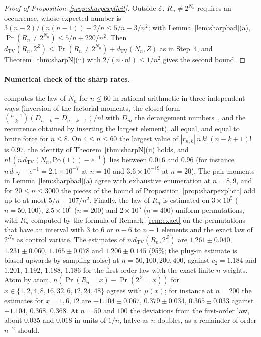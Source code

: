 \begin{proof}[Proof of Proposition~\ref{prop:sharpexplicit}]
Outside $\mathcal E$, $R_n\ne2^{N_n}$ requires an occurrence, whose expected number is $3(n-2)/(n(n-1))+2/n\le5/n-3/n^2$; with Lemma~\ref{lem:sharpbad}(a), $\Pr(R_n\ne2^{N_n})\le5/n+220/n^2$. Then $d_{\mathrm{TV}}(R_n,2^Z)\le\Pr(R_n\ne2^{N_n})+d_{\mathrm{TV}}(N_n,Z)$ as in Step~4, and Theorem~\ref{thm:sharpN}(ii) with $2/(n\cdot n!)\le1/n^2$ gives the second bound.
\end{proof}

\paragraph{Numerical check of the sharp rates.}
 computes the law of $N_n$ for $n\le60$ in rational arithmetic in three independent ways (inversion of the factorial moments, the closed form $\binom{n-1}{k}(D_{n-k}+D_{n-k-1})/n!$ with $D_m$ the derangement numbers~\citep{kaplansky1945}, and the recurrence obtained by inserting the largest element), all equal, and equal to brute force for $n\le8$. On $4\le n\le60$ the largest value of $|r_{n,k}|\,n\,k!\,(n-k+1)!$ is $0.97$, the identity of Theorem~\ref{thm:sharpN}(ii) holds, and $n!\,(n\,d_{\mathrm{TV}}(N_n,\mathrm{Po}(1))-e^{-1})$ lies between $0.016$ and $0.96$ (for instance $n\,d_{\mathrm{TV}}-e^{-1}=2.1\times10^{-7}$ at $n=10$ and $3.6\times10^{-19}$ at $n=20$). The pair moments in Lemma~\ref{lem:sharpbad}(a) agree with exhaustive enumeration at $n=8,9$, and for $20\le n\le3000$ the pieces of the bound of Proposition~\ref{prop:sharpexplicit} add up to at most $5/n+107/n^2$. Finally, the law of $R_n$ is estimated on $3\times10^5$ ($n=50,100$), $2.5\times10^5$ ($n=200$) and $2\times10^5$ ($n=400$) uniform permutations, with $R_n$ computed by the formula of Remark~\ref{rem:exact} on the permutations that have an interval with $3$ to $6$ or $n-6$ to $n-1$ elements and the exact law of $2^{N_n}$ as control variate. The estimates of $n\,d_{\mathrm{TV}}(R_n,2^Z)$ are $1.261\pm0.040$, $1.231\pm0.060$, $1.165\pm0.078$ and $1.206\pm0.145$ (95\%; the plug-in estimate is biased upwards by sampling noise) at $n=50,100,200,400$, against $c_2=1.184$ and $1.201$, $1.192$, $1.188$, $1.186$ for the first-order law with the exact finite-$n$ weights. Atom by atom, $n(\Pr(R_n=x)-\Pr(2^Z=x))$ for $x\in\{1,2,4,8,16,32,6,12,24,48\}$ agrees with $\mu(x)$; for instance at $n=200$ the estimates for $x=1,6,12$ are $-1.104\pm0.067$, $0.379\pm0.034$, $0.365\pm0.033$ against $-1.104$, $0.368$, $0.368$. At $n=50$ and $100$ the deviations from the first-order law, about $0.035$ and $0.018$ in units of $1/n$, halve as $n$ doubles, as a remainder of order $n^{-2}$ should.
